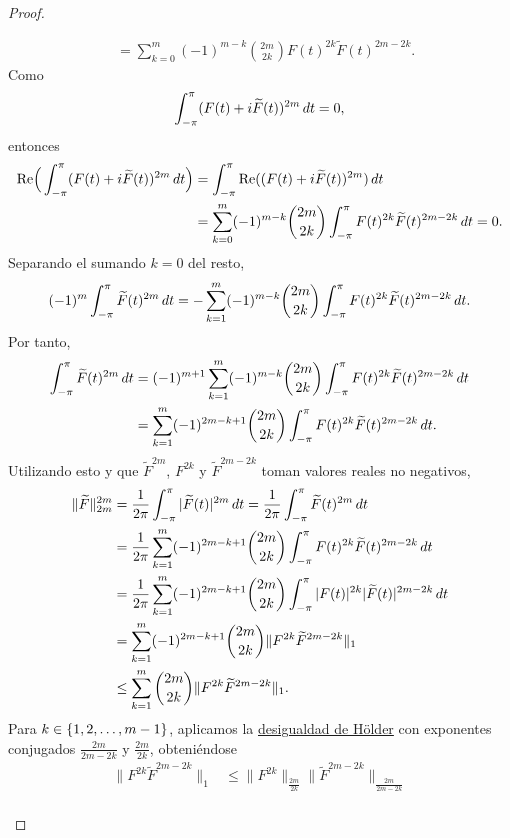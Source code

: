 \documentclass[a4paper, 12pt]{book}
\begin{document}
\begin{proof}
\begin{itemize}
\begin{align*}
            &= \sum_{k=0}^{m}(-1)^{m-k} \binom{2m}{2k}F(t)^{2k}\widetilde{F}(t)^{2m-2k}.
        \end{align*}
        Como
        \[\int_{-\pi}^{\pi} (F(t)+i\widetilde{F}(t))^{2m} \, dt = 0,\]
        entonces
        \begin{align*}
            \textup{Re}\Bigl(\,\int_{-\pi}^{\pi} (F(t)+i\widetilde{F}(t))^{2m} \, dt\Bigr) &= \int_{-\pi}^{\pi} \textup{Re}((F(t)+i\widetilde{F}(t))^{2m}) \, dt \\ 
            &= \sum_{k=0}^{m}(-1)^{m-k}\binom{2m}{2k}\int_{-\pi}^{\pi} F(t)^{2k}\widetilde{F}(t)^{2m-2k} \, dt = 0.
        \end{align*}
        Separando el sumando $k = 0$ del resto,
        \[(-1)^m\int_{-\pi}^{\pi} \widetilde{F}(t)^{2m} \, dt = -\sum_{k=1}^{m}(-1)^{m-k}\binom{2m}{2k}\int_{-\pi}^{\pi} F(t)^{2k}\widetilde{F}(t)^{2m-2k} \, dt.\]
        Por tanto,
        \begin{align*}
            \int_{-\pi}^{\pi} \widetilde{F}(t)^{2m} \, dt &= (-1)^{m+1}\sum_{k=1}^{m}(-1)^{m-k}\binom{2m}{2k}\int_{-\pi}^{\pi} F(t)^{2k}\widetilde{F}(t)^{2m-2k} \, dt \\
            &= \sum_{k=1}^{m}(-1)^{2m-k+1}\binom{2m}{2k}\int_{-\pi}^{\pi} F(t)^{2k}\widetilde{F}(t)^{2m-2k} \, dt.
        \end{align*}
        Utilizando esto y que $\widetilde{F}^{2m}$, $F^{2k}$ y $\widetilde{F}^{2m-2k}$ toman valores reales no negativos,
        \begin{align*}
            \|\widetilde{F}\|_{2m}^{2m} &= \frac{1}{2\pi}\int_{-\pi}^{\pi} |\widetilde{F}(t)|^{2m} \, dt = \frac{1}{2\pi}\int_{-\pi}^{\pi} \widetilde{F}(t)^{2m} \, dt \\
            &= \frac{1}{2\pi}\sum_{k=1}^{m}(-1)^{2m-k+1}\binom{2m}{2k}\int_{-\pi}^{\pi} F(t)^{2k}\widetilde{F}(t)^{2m-2k} \, dt \\
            &= \frac{1}{2\pi}\sum_{k=1}^{m}(-1)^{2m-k+1}\binom{2m}{2k}\int_{-\pi}^{\pi} |F(t)|^{2k}|\widetilde{F}(t)|^{2m-2k} \, dt \\
            &=\sum_{k=1}^{m}(-1)^{2m-k+1}\binom{2m}{2k}\|F^{2k}\widetilde{F}^{2m-2k}\|_1 \\
            &\leq \sum_{k=1}^{m}\binom{2m}{2k}\|F^{2k}\widetilde{F}^{2m-2k}\|_1.
        \end{align*}
        Para $k\in\{1,2,\mathellipsis,m-1\}$, aplicamos la \hyperref[1.1.1]{desigualdad de Hölder} con exponentes conjugados $\frac{2m}{2m-2k}$ y $\frac{2m}{2k}$, obteniéndose
        \begin{align*}
            \|F^{2k}\widetilde{F}^{2m-2k}\|_1 &\leq \|F^{2k}\|_{\frac{2m}{2k}}\|\widetilde{F}^{2m-2k}\|_{\frac{2m}{2m-2k}} \\

\end{align*}
\end{itemize}
\end{proof}
\end{document}
